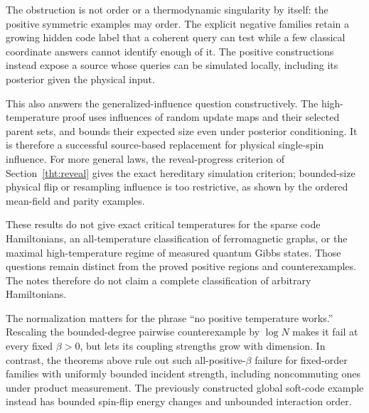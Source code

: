 The obstruction is not order or a thermodynamic singularity by itself:
the positive symmetric examples may order. The explicit negative
families retain a growing hidden code label that a coherent query can
test while a few classical coordinate answers cannot identify enough
of it. The positive constructions instead expose a source whose
queries can be simulated locally, including its posterior given the
physical input.

This also answers the generalized-influence question constructively.
The high-temperature proof uses influences of random update maps and
their selected parent sets, and bounds their expected size even under
posterior conditioning. It is therefore a successful source-based
replacement for physical single-spin influence. For more general
laws, the reveal-progress criterion of
Section~\ref{tht:reveal} gives the exact hereditary simulation
criterion; bounded-size physical flip or resampling influence is too
restrictive, as shown by the ordered mean-field and parity examples.

These results do not give exact critical temperatures for the sparse
code Hamiltonians, an all-temperature classification of ferromagnetic
graphs, or the maximal high-temperature regime of measured quantum
Gibbs states. Those questions remain distinct from the proved positive
regions and counterexamples. The notes therefore do not claim a
complete classification of arbitrary Hamiltonians.

The normalization matters for the phrase ``no positive temperature
works.'' Rescaling the bounded-degree pairwise counterexample by
$\log N$ makes it fail at every fixed $\beta>0$, but lets its coupling
strengths grow with dimension. In contrast, the theorems above rule
out such all-positive-$\beta$ failure for fixed-order families with
uniformly bounded incident strength, including noncommuting ones
under product measurement. The previously constructed global soft-code
example instead has bounded spin-flip energy changes and unbounded
interaction order.

